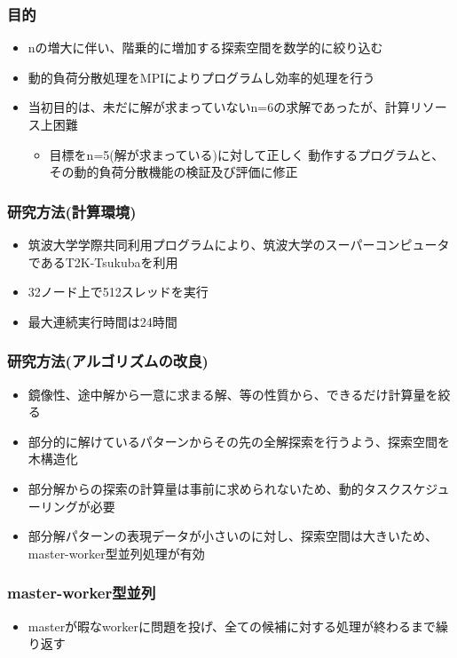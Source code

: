 \documentclass[dvipdfmx,20pt,notheorems,t]{beamer}
\begin{document}
\begin{frame}\frametitle{目的}
\begin{itemize}
\item nの増大に伴い、階乗的に増加する探索空間を数学的に絞り込む
\item 動的負荷分散処理をMPIによりプログラムし効率的処理を行う
\item 当初目的は、未だに解が求まっていないn=6の求解であったが、計算リソース上困難
\begin{itemize}
\item 目標をn=5(解が求まっている)に対して正しく 動作するプログラムと、その動的負荷分散機能の検証及び評価に修正
\end{itemize}
\end{itemize}
\end{frame}

\begin{frame}\frametitle{研究方法(計算環境)}
\begin{itemize}
\item 筑波大学学際共同利用プログラムにより、筑波大学のスーパーコンピュータであるT2K-Tsukubaを利用
\item 32ノード上で512スレッドを実行
\item 最大連続実行時間は24時間
\end{itemize}
\end{frame}

\begin{frame}\frametitle{研究方法(アルゴリズムの改良)}
\begin{itemize}
\item 鏡像性、途中解から一意に求まる解、等の性質から、できるだけ計算量を絞る
\item 部分的に解けているパターンからその先の全解探索を行うよう、探索空間を木構造化
\item 部分解からの探索の計算量は事前に求められないため、動的タスクスケジューリングが必要
\item 部分解パターンの表現データが小さいのに対し、探索空間は大きいため、master-worker型並列処理が有効
\end{itemize}
\end{frame}

\begin{frame}\frametitle{master-worker型並列}
\begin{itemize}
\item masterが暇なworkerに問題を投げ、全ての候補に対する処理が終わるまで繰り返す
\end{itemize}
\end{frame}
\end{document}
